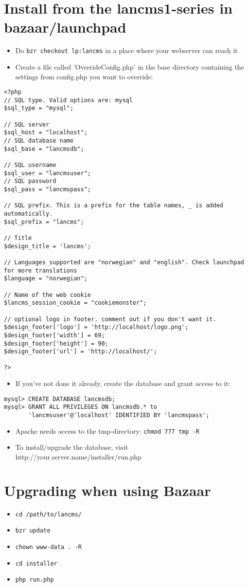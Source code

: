 \section{Install from the lancms1-series in bazaar/launchpad}
\begin{itemize}
\item Do \texttt{bzr checkout lp:lancms} in a place where your webserver can reach it
\item Create a file called 'OverrideConfig.php' in the base directory containing the settings from config.php you want to override:
\end{itemize}
\begin{lstlisting}
<?php
// SQL type. Valid options are: mysql
$sql_type = "mysql";

// SQL server
$sql_host = "localhost";
// SQL database name
$sql_base = "lancmsdb";

// SQL username
$sql_user = "lancmsuser";
// SQL password
$sql_pass = "lancmspass";

// SQL prefix. This is a prefix for the table names, _ is added automatically.
$sql_prefix = "lancms";

// Title
$design_title = 'lancms';

// Languages supported are "norwegian" and "english". Check launchpad for more translations
$language = "norwegian";

// Name of the web cookie
$lancms_session_cookie = "cookiemonster";

// optional logo in footer. comment out if you don't want it.
$design_footer['logo'] = 'http://localhost/logo.png';
$design_footer['width'] = 69;
$design_footer['height'] = 90;
$design_footer['url'] = 'http://localhost/';

?>
\end{lstlisting}
\begin{itemize}
\item If you've not done it already, create the database and grant access to
it:
\end{itemize}
\begin{lstlisting}
mysql> CREATE DATABASE lancmsdb;
mysql> GRANT ALL PRIVILEGES ON lancmsdb.* to
       'lancmsuser'@'localhost' IDENTIFIED BY 'lancmspass';
\end{lstlisting}
\begin{itemize}
\item Apache needs access to the tmp-directory: \texttt{chmod 777 tmp -R}
\item To install/upgrade the database, visit
http://your.server.name/installer/run.php
\end{itemize}

\section{Upgrading when using Bazaar}
\begin{itemize}
\item \texttt{cd /path/to/lancms/}
\item \texttt{bzr update}
\item \texttt{chown www-data . -R}
\item \texttt{cd installer}
\item \texttt{php run.php}
\end{itemize}
